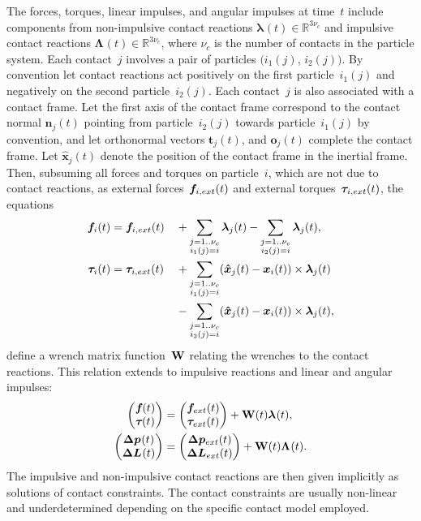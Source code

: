 \documentclass[global,twocolumn]{svjour}
\let\vec\bm
\newcommand{\mat}[1]{{\bf #1}}
\newcommand{\R}{\mathbb{R}}
\newcommand{\dvect}[2]{\ensuremath{\begin{pmatrix}#1\\#2\end{pmatrix}}}
\newcommand{\cross}{\times}
\newcommand{\pos}    [1]{\ensuremath{\vec{x}_{#1}}}
\newcommand{\force}    [1]{\ensuremath{\vec{f}_{#1}}}
\newcommand{\torque}   [1]{\ensuremath{\vec{\tau}_{#1}}}
\newcommand{\forceext} [1]{\ensuremath{\vec{f}_{\ifstrequal{#1}{}{ext}{#1,ext}}}}
\newcommand{\torqueext}[1]{\ensuremath{\vec{\tau}_{\ifstrequal{#1}{}{ext}{#1,ext}}}}
\newcommand{\linimp}   [1]{\ensuremath{\vec{\Delta p}_{#1}}}
\newcommand{\angimp}   [1]{\ensuremath{\vec{\Delta L}_{#1}}}
\newcommand{\contactforce}[1]{\ensuremath{\vec{\lambda}_{#1}}}
\newcommand{\contactimpulse}[1]{\ensuremath{\vec{\Lambda}_{#1}}}
\newcommand{\contactpos}    [1]{\ensuremath{\vec{\hat{x}}_{#1}}}
\newcommand{\numcontacts}{\ensuremath{\nu_c}}
\newcommand{\twodots}{\ensuremath{\mathrel{\ldotp\ldotp}}}
\begin{document}
		The forces, torques, linear impulses, and angular impulses at time~$t$
		include components from non-impulsive contact reactions
		$\contactforce{}(t) \in \R^{3\numcontacts}$ and impulsive contact
		reactions $\contactimpulse{}(t) \in \R^{3\numcontacts}$, where
		\numcontacts{} is the number of contacts in the particle system.
		Each contact~$j$ involves a pair of particles $(i_1(j)$, $i_2(j))$.
		By convention let contact reactions act positively on the first
		particle~$i_1(j)$ and negatively on the second particle~$i_2(j)$.
		Each contact~$j$ is also associated with a contact frame. Let the first
		axis of the contact frame correspond to the contact normal $\vec n_j(t)$ pointing from
		particle~$i_2(j)$ towards particle~$i_1(j)$ by convention, and let
		orthonormal vectors $\vec t_j(t)$, and $\vec o_j(t)$ complete the contact
		frame. Let $\contactpos{j}(t)$ denote the position of the contact frame
		in the inertial frame. Then, subsuming all forces and torques on
		particle~$i$, which are not due to contact reactions, as external
		forces~$\forceext{i}(t)$ and external torques~$\torqueext{i}(t)$, the equations
		\begin{align*}
			\force{i}(t) & = \forceext{i}(t) && + \sum_{\substack{j = 1\twodots\numcontacts\\i_1(j)=i}} \contactforce{j}(t) - \sum_{\substack{j = 1\twodots\numcontacts\\i_2(j)=i}} \contactforce{j}(t), \\
			\torque{i}(t) & = \torqueext{i}(t) && + \sum_{\substack{j = 1\twodots\numcontacts\\i_1(j)=i}} (\contactpos{j}(t) - \pos{i}(t)) \cross \contactforce{j}(t) \\
			&&& - \sum_{\substack{j = 1\twodots\numcontacts\\i_2(j)=i}} (\contactpos{j}(t) - \pos{i}(t)) \cross \contactforce{j}(t),
		\end{align*}
		define a wrench matrix function~$\mat{W}$ relating the wrenches to the contact reactions. This relation extends to impulsive reactions and linear and angular impulses:
		\begin{equation*}
			\begin{split}
				\dvect{\force{}(t)}{\torque{}(t)} & = \dvect{\forceext{}(t)}{\torqueext{}(t)} + \mat{W}(t) \contactforce{}(t),\\
				\dvect{\linimp{}(t)}{\angimp{}(t)} & = \dvect{\linimp{ext}(t)}{\angimp{ext}(t)} + \mat{W}(t) \contactimpulse{}(t).
			\end{split}
		\end{equation*}
		The impulsive and non-impulsive contact reactions are then given
		implicitly as solutions of contact constraints. The contact constraints
		are usually non-linear and underdetermined depending on the specific
		contact model employed.
\end{document}
